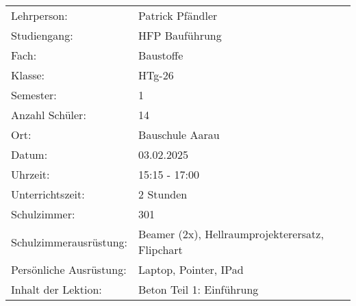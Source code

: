 \documentclass[
11pt,
captions=tableheading,
smallheadings,
headsepline,
footsepline, 
captions=tableheading,
parskip=half-,
]{scrartcl}
\begin{document}
\begin{table}[ht]
    \centering
    \label{tab:uebersicht}
    \begin{tabularx}{\textwidth}{@{}Xp{11cm}@{}}
        \toprule
        Lehrperson:             & Patrick Pfändler                                \\
        Studiengang:            & HFP Bauführung                                  \\
        Fach:                   & Baustoffe                                       \\
        \midrule
        Klasse:                 & HTg-26                                          \\
        Semester:               & 1                                               \\
        Anzahl Schüler:         & 14                                              \\
        Ort:                    & Bauschule Aarau                                 \\
        Datum:                  & 03.02.2025                                      \\
        Uhrzeit:                & 15:15 - 17:00                                    \\
        Unterrichtszeit:        & 2 Stunden                                       \\
        Schulzimmer:            & 301                                             \\
        Schulzimmerausrüstung:  & Beamer (2x), Hellraumprojekterersatz, Flipchart \\
        \midrule
        Persönliche Ausrüstung: & Laptop, Pointer, IPad                           \\
        \midrule
        Inhalt der Lektion:     & Beton Teil 1: Einführung                        \\
        \bottomrule
    \end{tabularx}
\end{table}




\clearpage
\vspace*{2cm}
\setcounter{tocdepth}{3} %
\tableofcontents%
\clearpage
\end{document}
